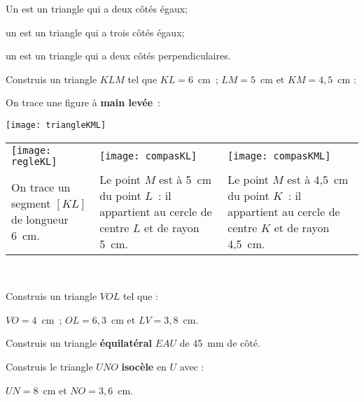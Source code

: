 
\begin{definition}
Un  est un triangle qui a deux côtés égaux;

un  est un triangle qui a trois côtés égaux;

un  est un triangle qui a deux côtés perpendiculaires.
\end{definition}

\begin{methode*1}

\begin{exemple*1}
Construis un triangle $KLM$ tel que $KL = 6$ cm ; $LM = 5$ cm et $KM = 4,5$ cm :

On trace une figure à \textbf{main levée} :
\begin{center} \texttt{[image: triangleKML]} \end{center}

\begin{tabularx}{\textwidth}{X|X|X}
 \texttt{[image: regleKL]} &  \texttt{[image: compasKL]} & \texttt{[image: compasKML]} \\ 
 On trace un segment $[KL]$ de longueur 6 cm. & Le point $M$ est à 5 cm du point $L$ : il appartient au cercle de centre $L$ et de rayon 5 cm. & Le point $M$ est à 4,5 cm du point $K$ : il appartient au cercle de centre $K$ et de rayon 4,5 cm. \\
\end{tabularx} \\

\end{exemple*1}

\exercice 
Construis un triangle $VOL$ tel que :

$VO = 4$ cm ; $OL = 6,3$ cm et $LV = 3,8$ cm.

\vspace{2cm}

\exercice 
Construis un triangle \textbf{équilatéral} $EAU$ de 45 mm de côté.

\vspace{2cm}

\exercice 
Construis le triangle $UNO$ \textbf{isocèle} en $U$ avec :

$UN = 8$ cm et $NO = 3,6$ cm.
 
\end{methode*1}

